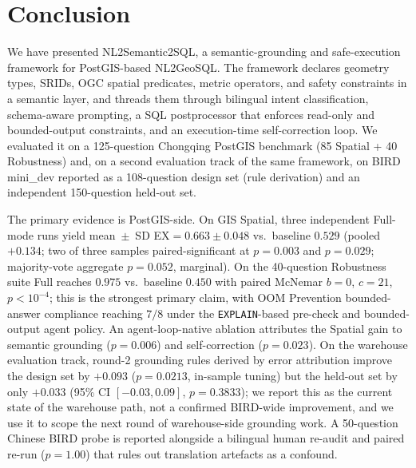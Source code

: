 \documentclass[11pt]{article}
\begin{document}
\section{Conclusion}
\label{sec:conclusion}
\begin{sloppypar}

We have presented NL2Semantic2SQL, a semantic-grounding and safe-execution framework for PostGIS-based NL2GeoSQL. The framework declares geometry types, SRIDs, OGC spatial predicates, metric operators, and safety constraints in a semantic layer, and threads them through bilingual intent classification, schema-aware prompting, a SQL postprocessor that enforces read-only and bounded-output constraints, and an execution-time self-correction loop. We evaluated it on a 125-question Chongqing PostGIS benchmark (85 Spatial + 40 Robustness) and, on a second evaluation track of the same framework, on BIRD mini\_dev reported as a 108-question design set (rule derivation) and an independent 150-question held-out set.

The primary evidence is PostGIS-side. On GIS Spatial, three independent Full-mode runs yield mean~$\pm$~SD EX$=0.663 \pm 0.048$ vs.\ baseline $0.529$ (pooled $+0.134$; two of three samples paired-significant at $p=0.003$ and $p=0.029$; majority-vote aggregate $p=0.052$, marginal). On the 40-question Robustness suite Full reaches $0.975$ vs.\ baseline $0.450$ with paired McNemar $b=0$, $c=21$, $p<10^{-4}$; this is the strongest primary claim, with OOM Prevention bounded-answer compliance reaching $7/8$ under the \texttt{EXPLAIN}-based pre-check and bounded-output agent policy. An agent-loop-native ablation attributes the Spatial gain to semantic grounding ($p=0.006$) and self-correction ($p=0.023$). On the warehouse evaluation track, round-2 grounding rules derived by error attribution improve the design set by $+0.093$ ($p=0.0213$, in-sample tuning) but the held-out set by only $+0.033$ (95\% CI $[-0.03, 0.09]$, $p=0.3833$); we report this as the current state of the warehouse path, not a confirmed BIRD-wide improvement, and we use it to scope the next round of warehouse-side grounding work. A 50-question Chinese BIRD probe is reported alongside a bilingual human re-audit and paired re-run ($p=1.00$) that rules out translation artefacts as a confound.


\end{sloppypar}
\end{document}
